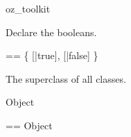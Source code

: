 \begin{zsection}
  \SECTION oz\_toolkit
\end{zsection}













Declare the booleans.
\begin{zed}
  \bool == \{ [|true], [|false] \}
\end{zed}

The superclass of all classes.
\begin{class}{Object}
\end{class}

\begin{zed}
  \oid == \poly Object
\end{zed}
